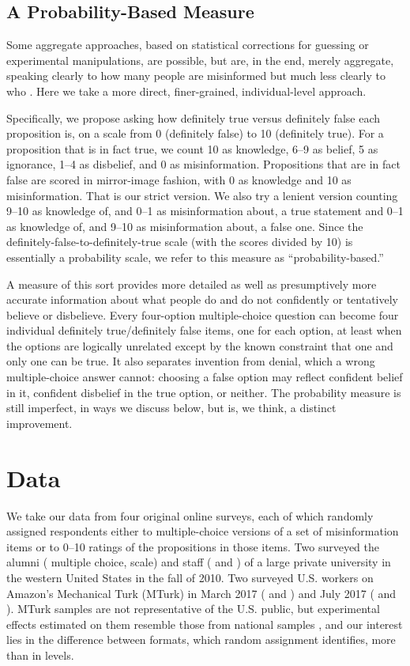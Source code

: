 \documentclass[11pt]{article}
\begin{document}
\subsection{A Probability-Based Measure}

Some aggregate approaches, based on statistical corrections for guessing or experimental manipulations, are possible, but are, in the end, merely aggregate, speaking clearly to how many people are misinformed but much less clearly to who \citep{cor2016, luskin2018}. Here we take a more direct, finer-grained, individual-level approach.

Specifically, we propose asking how definitely true versus definitely false each proposition is, on a scale from 0 (definitely false) to 10 (definitely true). For a proposition that is in fact true, we count 10 as knowledge, 6--9 as belief, 5 as ignorance, 1--4 as disbelief, and 0 as misinformation. Propositions that are in fact false are scored in mirror-image fashion, with 0 as knowledge and 10 as misinformation. That is our strict version. We also try a lenient version counting 9--10 as knowledge of, and 0--1 as misinformation about, a true statement and 0--1 as knowledge of, and 9--10 as misinformation about, a false one. Since the definitely-false-to-definitely-true scale (with the scores divided by 10) is essentially a probability scale, we refer to this measure as ``probability-based.''

A measure of this sort provides more detailed as well as presumptively more accurate information about what people do and do not confidently or tentatively believe or disbelieve. Every four-option multiple-choice question can become four individual definitely true/definitely false items, one for each option, at least when the options are logically unrelated except by the known constraint that one and only one can be true. It also separates invention from denial, which a wrong multiple-choice answer cannot: choosing a false option may reflect confident belief in it, confident disbelief in the true option, or neither. The probability measure is still imperfect, in ways we discuss below, but is, we think, a distinct improvement.

\section{Data}

We take our data from four original online surveys, each of which randomly assigned respondents either to multiple-choice versions of a set of misinformation items or to 0--10 ratings of the propositions in those items. Two surveyed the alumni (\nAlumniMc{} multiple choice, \nAlumniScale{} scale) and staff (\nStaffMc{} and \nStaffScale{}) of a large private university in the western United States in the fall of 2010. Two surveyed U.S. workers on Amazon's Mechanical Turk (MTurk) in March 2017 (\nMarchMc{} and \nMarchScale{}) and July 2017 (\nJulyMc{} and \nJulyScale{}). MTurk samples are not representative of the U.S. public, but experimental effects estimated on them resemble those from national samples \citep{berinsky2012, huff2015, mullinix2015}, and our interest lies in the difference between formats, which random assignment identifies, more than in levels.
\end{document}
